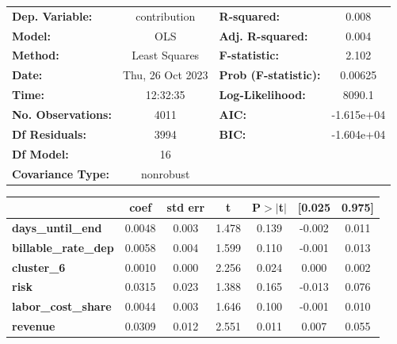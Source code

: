 \begin{center}
\begin{tabular}{lclc}
\toprule
\textbf{Dep. Variable:}      &   contribution   & \textbf{  R-squared:         } &     0.008   \\
\textbf{Model:}              &       OLS        & \textbf{  Adj. R-squared:    } &     0.004   \\
\textbf{Method:}             &  Least Squares   & \textbf{  F-statistic:       } &     2.102   \\
\textbf{Date:}               & Thu, 26 Oct 2023 & \textbf{  Prob (F-statistic):} &  0.00625    \\
\textbf{Time:}               &     12:32:35     & \textbf{  Log-Likelihood:    } &    8090.1   \\
\textbf{No. Observations:}   &        4011      & \textbf{  AIC:               } & -1.615e+04  \\
\textbf{Df Residuals:}       &        3994      & \textbf{  BIC:               } & -1.604e+04  \\
\textbf{Df Model:}           &          16      & \textbf{                     } &             \\
\textbf{Covariance Type:}    &    nonrobust     & \textbf{                     } &             \\
\bottomrule
\end{tabular}
\begin{tabular}{lcccccc}
                             & \textbf{coef} & \textbf{std err} & \textbf{t} & \textbf{P$> |$t$|$} & \textbf{[0.025} & \textbf{0.975]}  \\
\midrule
\textbf{days\_until\_end}    &       0.0048  &        0.003     &     1.478  &         0.139        &       -0.002    &        0.011     \\
\textbf{billable\_rate\_dep} &       0.0058  &        0.004     &     1.599  &         0.110        &       -0.001    &        0.013     \\
\textbf{cluster\_6}          &       0.0010  &        0.000     &     2.256  &         0.024        &        0.000    &        0.002     \\
\textbf{risk}                &       0.0315  &        0.023     &     1.388  &         0.165        &       -0.013    &        0.076     \\
\textbf{labor\_cost\_share}  &       0.0044  &        0.003     &     1.646  &         0.100        &       -0.001    &        0.010     \\
\textbf{revenue}             &       0.0309  &        0.012     &     2.551  &         0.011        &        0.007    &        0.055     \\

\end{tabular}
\end{center}
